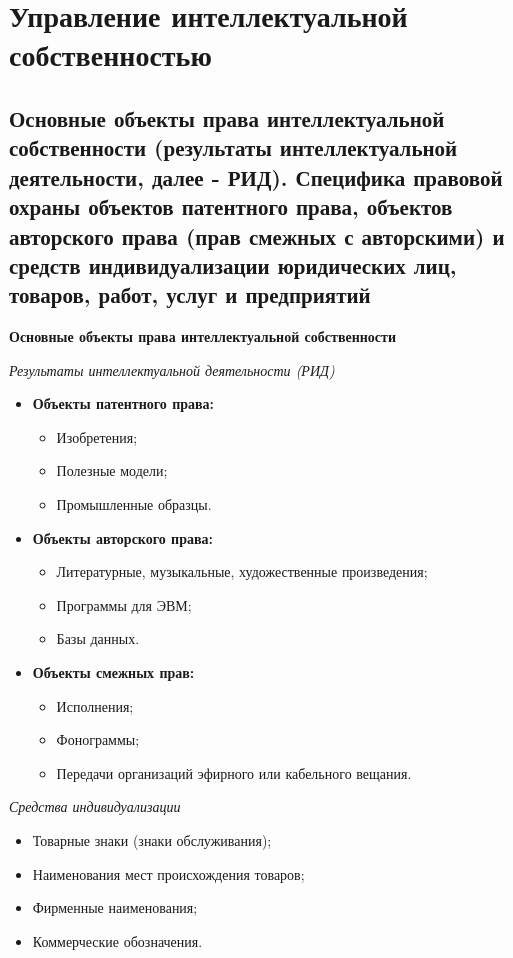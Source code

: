 \section{Управление интеллектуальной собственностью}

\subsection{Основные объекты права интеллектуальной собственности (результаты интеллектуальной деятельности, далее - РИД). Специфика правовой охраны объектов патентного права, объектов авторского права (прав смежных с авторскими) и средств индивидуализации юридических лиц, товаров, работ, услуг и предприятий}

\textbf{Основные объекты права интеллектуальной собственности}

\textit{Результаты интеллектуальной деятельности (РИД)}

\begin{itemize}
    \item \textbf{Объекты патентного права:}
    \begin{itemize}
        \item Изобретения;
        \item Полезные модели;
        \item Промышленные образцы.
    \end{itemize}
    \item \textbf{Объекты авторского права:}
    \begin{itemize}
        \item Литературные, музыкальные, художественные произведения;
        \item Программы для ЭВМ;
        \item Базы данных.
    \end{itemize}
    \item \textbf{Объекты смежных прав:}
    \begin{itemize}
        \item Исполнения;
        \item Фонограммы;
        \item Передачи организаций эфирного или кабельного вещания.
    \end{itemize}
\end{itemize}

\textit{Средства индивидуализации}

\begin{itemize}
    \item Товарные знаки (знаки обслуживания);
    \item Наименования мест происхождения товаров;
    \item Фирменные наименования;
    \item Коммерческие обозначения.
\end{itemize}

